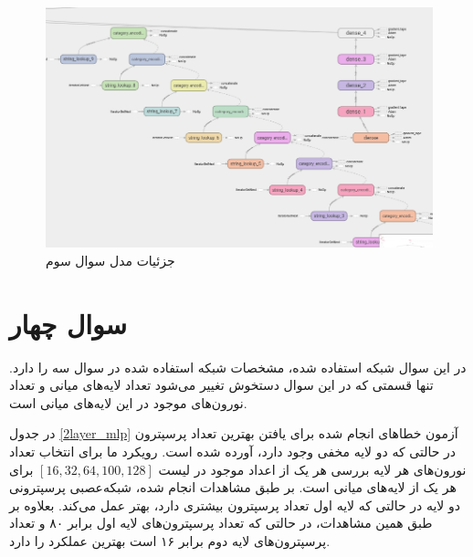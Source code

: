 \documentclass[12pt, a4paper]{article}
\begin{document}
\begin{figure}[h]
    \includegraphics[width=\linewidth]{images/details.png}
    \caption{جزئیات مدل سوال سوم}
    \label{details}
\end{figure}


\clearpage

\section*{سوال چهار}

در این سوال شبکه استفاده شده، مشخصات شبکه استفاده شده در سوال سه را دارد. تنها قسمتی که در این سوال
دستخوش تغییر می‌شود تعداد لایه‌های میانی و تعداد نورون‌های موجود در این لایه‌های میانی است.

در جدول \ref{2layer_mlp} آزمون خطاهای انجام شده برای یافتن بهترین تعداد پرسپترون در حالتی که
دو لایه مخفی وجود دارد، آورده شده است. رویکرد ما برای انتخاب تعداد نورون‌های هر لایه بررسی هر یک از اعداد موجود در لیست
$[16,32,64,100,128]$ برای هر یک از لایه‌های میانی است. بر طبق مشاهدات انجام شده،
شبکه‌عصبی پرسپترونی دو لایه در حالتی که لایه اول تعداد پرسپترون بیشتری دارد، بهتر عمل می‌کند.
بعلاوه بر طبق همین مشاهدات، در حالتی که تعداد
پرسپترون‌های لایه اول برابر ۸۰ و تعداد پرسپترون‌های لایه دوم برابر ۱۶ است بهترین عملکرد را دارد.
\end{document}
